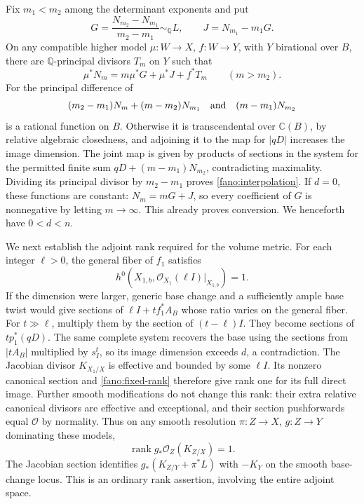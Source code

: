Fix $m_1<m_2$ among the determinant exponents and put
\[
 G=\frac{N_{m_2}-N_{m_1}}{m_2-m_1}\sim_{\mathbb Q}L,
 \qquad J=N_{m_1}-m_1G.
\]
On any compatible higher model $\mu:W\to X$, $f:W\to Y$, with
$Y$ birational over $B$, there are $\mathbb Q$-principal divisors
$T_m$ on $Y$ such that
\begin{equation}\label{fano:interpolation}
 \mu^*N_m=m\mu^*G+\mu^*J+f^*T_m\qquad(m>m_2).
\end{equation}
For the principal difference of
\[
 (m_2-m_1)N_m+(m-m_2)N_{m_1}
 \quad\hbox{and}\quad(m-m_1)N_{m_2}
\]
is a rational function on $B$.  Otherwise it is transcendental over
$\mathbb C(B)$, by relative algebraic closedness, and adjoining it
to the map for $|qD|$ increases the image dimension.  The joint map
is given by products of sections in the system for the permitted
finite sum $qD+(m-m_1)N_{m_2}$, contradicting maximality.
Dividing its principal divisor by $m_2-m_1$ proves
\eqref{fano:interpolation}.  If $d=0$, these functions are constant:
$N_m=mG+J$, so every coefficient of $G$ is nonnegative by letting
$m\to\infty$.  This already proves conversion.  We henceforth
have $0<d<n$.

We next establish the adjoint rank required for the volume metric.
For each integer $\ell>0$, the general fiber of $f_1$ satisfies
\begin{equation}\label{fano:fixed-rank}
 h^0(X_{1,b},\mathcal O_{X_1}(\ell I)|_{X_{1,b}})=1.
\end{equation}
If the dimension were larger, generic base change and a sufficiently
ample base twist would give sections of $\ell I+t f_1^*A_B$
whose ratio varies on the general fiber.  For $t\gg\ell$, multiply
them by the section of $(t-\ell)I$.  They become sections of
$t p_1^*(qD)$.  The same complete system recovers the base using the
sections from $|tA_B|$ multiplied by $s_I^t$, so its image dimension
exceeds $d$, a contradiction.  The Jacobian divisor $K_{X_1/X}$
is effective and bounded by some $\ell I$.  Its nonzero canonical
section and \eqref{fano:fixed-rank} therefore give rank one for its
full direct image.  Further smooth modifications do not change this
rank: their extra relative canonical divisors are effective and
exceptional, and their section pushforwards equal $\mathcal O$ by
normality.  Thus on any smooth resolution $\pi:Z\to X$,
$g:Z\to Y$ dominating these models,
\begin{equation}\label{fano:adjoint-rank}
 \operatorname{rank}g_*\mathcal O_Z(K_{Z/X})=1.
\end{equation}
The Jacobian section identifies
$g_*(K_{Z/Y}+\pi^*L)$ with $-K_Y$ on the smooth base-change locus.
This is an ordinary rank assertion, involving the entire adjoint
space.

